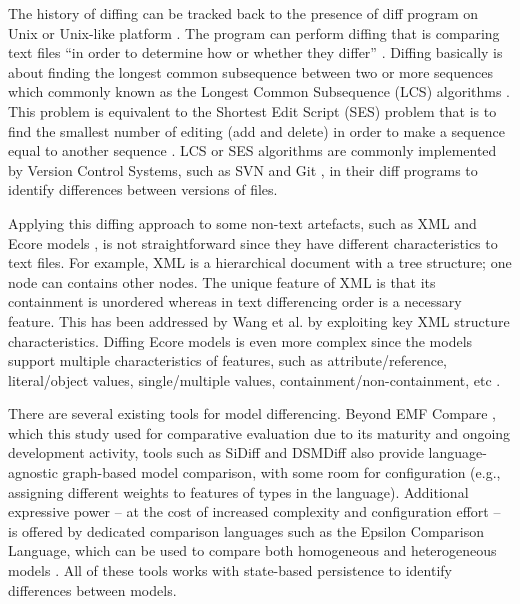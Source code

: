 The history of diffing can be tracked back to the presence of \textsf{diff} program on Unix or Unix-like platform \cite{hunt1976algorithm}. The program can perform diffing that is comparing text files ``in order to determine how or whether they differ'' \cite{diff}. Diffing basically is about finding the longest common subsequence between two or more sequences which commonly known as the Longest Common Subsequence (LCS) algorithms \cite{bergroth2000lcs}. This problem is equivalent to the Shortest Edit Script (SES) problem that is to find the smallest number of editing (add and delete) in order to make a sequence equal to another sequence \cite{DBLP:journals/algorithmica/Meyers86}. LCS or SES algorithms are commonly implemented by Version Control Systems, such as SVN \cite{svn-diff} and Git \cite{git-diff}, in their \textsf{diff} programs to identify differences between versions of files.   

Applying this diffing approach to some non-text artefacts, such as XML \cite{w3c-xml} and Ecore models \cite{steinberg2008emf}, is not straightforward since they have different characteristics to text files. For example, XML is a hierarchical document with a tree structure; one node can contains other nodes. The unique feature of XML is that its containment is  unordered whereas in text differencing order is a necessary feature. This has been addressed by Wang et al. \cite{wang2003xdiff} by exploiting key XML  structure characteristics. Diffing Ecore models is even more complex since the models support multiple characteristics of features, such as attribute/reference, literal/object values, single/multiple values, containment/non-containment, etc \cite{steinberg2008emf}. 

There are several existing tools for model differencing. Beyond EMF Compare \cite{emfcompare2018developer}, which this study used for comparative evaluation due to its maturity and ongoing development activity, tools such as SiDiff \cite{Treude2007SiDiff} and DSMDiff \cite{lin2009dsmdiff} also provide language-agnostic graph-based model comparison, with some room for configuration (e.g., assigning different weights to features of types in the language). Additional expressive power -- at the cost of increased complexity and configuration effort -- is offered by dedicated comparison languages such as the Epsilon Comparison Language, which can be used to compare both homogeneous and heterogeneous models \cite{kolovos2009ecl}. All of these tools works with state-based persistence to identify differences between models.

